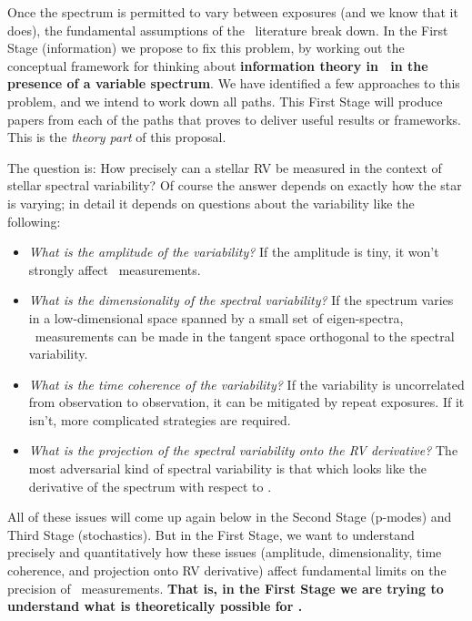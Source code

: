 \documentclass[12pt, letterpaper]{article}
\begin{document}
Once the spectrum is permitted to vary between exposures (and we know that
it does), the fundamental assumptions of the \EPRV\ literature break down.
In the First Stage (information) we propose to fix this problem, by
working out the conceptual framework for thinking about
\textbf{information theory in \EPRV\ in the presence of a variable
  spectrum}.
We have identified a few approaches to this problem, and we intend to
work down all paths.
This First Stage will produce papers from each of the paths that proves
to deliver useful results or frameworks.
This is the \emph{theory part} of this proposal.

The question is: How precisely can a stellar RV be measured in the context
of stellar spectral variability?
Of course the answer depends on exactly how the star is varying;
in detail it depends on questions about the variability like the following:
\begin{itemize}
\item
\emph{What is the amplitude of the variability?}
If the amplitude is tiny, it won't strongly affect \RV\ measurements.
\item
\emph{What is the dimensionality of the spectral variability?}
If the spectrum varies in a low-dimensional space spanned by a small set
of eigen-spectra, \EPRV\ measurements can be made in the tangent space
orthogonal to the spectral variability.
\item
\emph{What is the time coherence of the variability?}
If the variability is uncorrelated from observation to observation, it
can be mitigated by repeat exposures. If it isn't, more complicated
strategies are required.
\item
\emph{What is the projection of the spectral variability onto the RV derivative?}
The most adversarial kind of spectral variability is that which looks
like the derivative of the spectrum with respect to \RV.
\end{itemize}

\noindent
All of these issues will come up again below in the Second Stage (p-modes)
and Third Stage (stochastics).
But in the First Stage, we want to understand precisely and quantitatively
how these issues (amplitude, dimensionality, time coherence, and projection
onto RV derivative) affect fundamental limits on the precision of
\EPRV\ measurements.
\textbf{That is, in the First Stage we are trying to understand what is theoretically
possible for \EPRV.}
\end{document}
